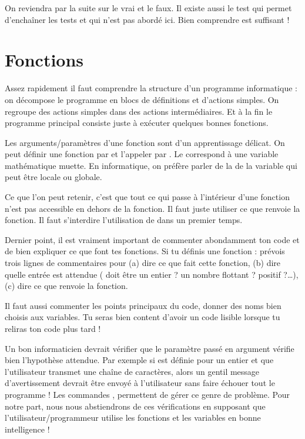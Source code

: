 \documentclass[11pt,class=report,crop=false]{standalone}
\begin{document}
On reviendra par la suite sur le \og{}vrai\fg{} et le \og{}faux\fg{}.
Il existe aussi le test
qui permet d'enchaîner les tests et qui n'est pas abordé ici. 
Bien comprendre  est suffisant ! 


\section{Fonctions}

Assez rapidement il faut comprendre la structure d'un programme informatique : on décompose le programme en blocs de définitions et d'actions simples. On regroupe des actions simples dans des actions intermédiaires. Et à la fin le programme principal consiste juste à exécuter quelques bonnes fonctions.

Les arguments/paramètres d'une fonction sont d'un apprentissage délicat.
On peut définir une fonction par  et l'appeler par
. Le  correspond à une variable mathématique muette. 
En informatique, on préfère parler de la  de la variable qui peut être locale ou globale.

Ce que l'on peut retenir, c'est que tout ce qui passe à l'intérieur d'une fonction n'est pas accessible en dehors de la fonction. Il faut juste utiliser ce que renvoie la fonction.
Il faut s’interdire l'utilisation de  dans un premier temps.

Dernier point, il est vraiment important de commenter abondamment ton code et de bien expliquer ce que font tes fonctions. Si tu définis une fonction  : prévois trois lignes de commentaires pour (a) dire ce que fait cette fonction, (b) dire quelle entrée est attendue ( doit être un entier ? un nombre flottant ? positif ?\ldots), (c) dire ce que renvoie la fonction.

Il faut aussi commenter les points principaux du code, donner des noms bien choisis aux variables. Tu seras bien content d'avoir un code lisible lorsque tu reliras ton code plus tard !

Un bon informaticien devrait vérifier que le paramètre passé en argument vérifie bien l'hypothèse attendue. Par exemple si  est définie pour un entier  et que l'utilisateur transmet une chaîne de caractères, alors un gentil message d'avertissement devrait être envoyé à l'utilisateur sans faire échouer tout le programme !
Les commandes ,  permettent de gérer ce genre de problème. 
Pour notre part, nous nous abstiendrons de ces vérifications en supposant que l'utilisateur/programmeur utilise les fonctions et les variables en bonne intelligence !
\end{document}
